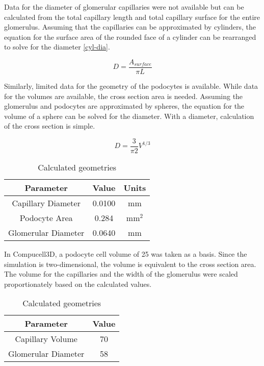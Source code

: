 \documentclass{article}
\begin{document}
	Data for the diameter of glomerular capillaries were not available but can be calculated from the total capillary length and total capillary surface for the entire glomerulus. Assuming that the capillaries can be approximated by cylinders, the equation for the surface area of the rounded face of a cylinder can be rearranged to solve for the diameter \eqref{cyl-dia}.
	
	\begin{equation}\label{cyl-dia}
		D = \frac{A_{surface}}{\pi L}
	\end{equation}
			
	Similarly, limited data for the geometry of the podocytes is available. While data for the volumes are available, the cross section area is needed. Assuming the glomerulus and podocytes are approximated by spheres, the equation for the volume of a sphere can be solved for the diameter. With a diameter, calculation of the cross section is simple.
	
	\begin{equation}\label{sph-dia}
		D = \frac{3}{\pi 2}V^{1/3}
	\end{equation}
	
\begin{table}[htbp]
\caption{Calculated geometries}
	\begin{center}
		\begin{tabular}{@{}c|cc@{}}
			Parameter & Value & Units \\ \midrule
			Capillary Diameter & 0.0100 & mm\\
			Podocyte Area & 0.284 & mm$^2$ \\
			Glomerular Diameter & 0.0640 & mm\\
			
		\end{tabular}
	\end{center}
\label{Approach2}
\end{table}
	
	In Compucell3D, a podocyte cell volume of 25 was taken as a basis. Since the simulation is two-dimensional, the volume is equivalent to the cross section area. The volume for the capillaries and the width of the glomerulus were scaled proportionately based on the calculated values.
	
\begin{table}[htbp]
\caption{Calculated geometries}
	\begin{center}
		\begin{tabular}{@{}c|c@{}}
			Parameter & Value \\ \midrule
			Capillary Volume & 70 \\
			Glomerular Diameter & 58 \\
			
		\end{tabular}
	\end{center}
\label{Approach2}
\end{table}
	
\end{document}
